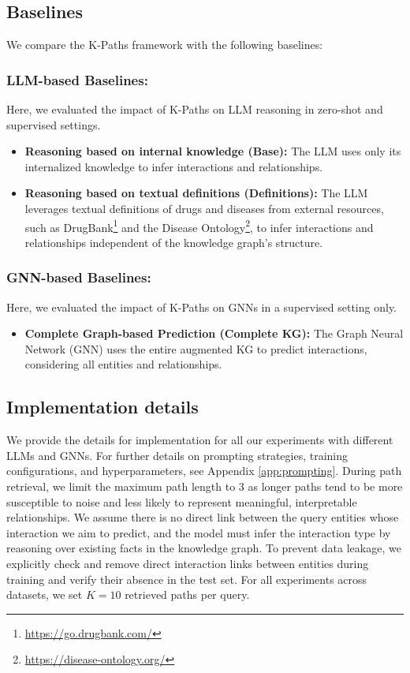 \subsection{Baselines}
We compare the K-Paths framework  with the following baselines:

\subsubsection{LLM-based Baselines:}
Here, we evaluated the impact of K-Paths on LLM reasoning in zero-shot and supervised settings. 
\begin{itemize}
    \item \textbf{Reasoning based on internal knowledge (Base):} The LLM uses only its internalized knowledge to infer interactions and relationships.
    \item \textbf{Reasoning based on textual definitions (Definitions):} The LLM leverages textual definitions of drugs and diseases from external resources, such as DrugBank\footnote{\url{https://go.drugbank.com/}} and the Disease Ontology\footnote{\url{https://disease-ontology.org/}}, to infer interactions and relationships independent of the knowledge graph's structure.

\end{itemize}

\subsubsection{GNN-based Baselines:}
Here, we evaluated the impact of K-Paths on GNNs in a supervised setting only.
\begin{itemize}
    \item \textbf{Complete Graph-based Prediction (Complete KG):} The Graph Neural Network (GNN) uses the entire augmented KG to predict interactions, considering all entities and relationships.
\end{itemize}

\subsection{Implementation details}
We provide the details for \sys implementation for all our experiments with different LLMs and GNNs. 
For further details on prompting strategies, training configurations, and hyperparameters, see Appendix \ref{app:prompting}.
During path retrieval, we limit the maximum path length to 3 as longer paths tend to be more susceptible to noise and less likely to represent meaningful, interpretable relationships.
We assume there is no direct link between the query entities whose interaction we aim to predict, and the model must infer the interaction type by reasoning over existing facts in the knowledge graph. 
To prevent data leakage, we explicitly check and remove direct interaction links between entities during training and verify their absence in the test set.
For all experiments across datasets, we set  \(K = 10\) retrieved paths per query.

